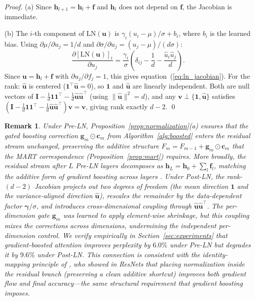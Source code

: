 \documentclass{article}
\newtheorem{remark}{Remark}
\theoremstyle{definition}
\begin{document}
\begin{proof}
(a) Since $\mathbf{h}_{l+1} = \mathbf{h}_l + \mathbf{f}$ and $\mathbf{h}_l$ does not depend on $\mathbf{f}$, the Jacobian is immediate.

(b) The $i$-th component of $\mathrm{LN}(\mathbf{u})$ is $\gamma_i(u_i - \mu)/\sigma + b_i$, where $b_i$ is the learned bias.
Using $\partial \mu / \partial u_j = 1/d$ and $\partial \sigma / \partial u_j = (u_j - \mu)/(d\sigma)$:
\[
\frac{\partial [\mathrm{LN}(\mathbf{u})]_i}{\partial u_j} = \frac{\gamma_i}{\sigma}\left(\delta_{ij} - \frac{1}{d} - \frac{\hat{u}_i \hat{u}_j}{d}\right).
\]
Since $\mathbf{u} = \mathbf{h}_l + \mathbf{f}$ with $\partial u_j / \partial f_j = 1$, this gives equation~(\ref{eq:ln_jacobian}).
For the rank: $\hat{\mathbf{u}}$ is centered ($\mathbf{1}^\top \hat{\mathbf{u}} = 0$), so $\mathbf{1}$ and $\hat{\mathbf{u}}$ are linearly independent.
Both are null vectors of $\mathbf{I} - \frac{1}{d}\mathbf{1}\mathbf{1}^\top - \frac{1}{d}\hat{\mathbf{u}}\hat{\mathbf{u}}^\top$ (using $\|\hat{\mathbf{u}}\|^2 = d$), and any $\mathbf{v} \perp \{\mathbf{1}, \hat{\mathbf{u}}\}$ satisfies $(\mathbf{I} - \frac{1}{d}\mathbf{1}\mathbf{1}^\top - \frac{1}{d}\hat{\mathbf{u}}\hat{\mathbf{u}}^\top)\mathbf{v} = \mathbf{v}$, giving rank exactly $d - 2$. \qed
\end{proof}

\begin{remark}
\label{rem:normalization}
Under Pre-LN, Proposition~\ref{prop:normalization}(a) ensures that the gated boosting correction $\mathbf{g}_m \odot \mathbf{c}_m$ from Algorithm~\ref{alg:boosted} enters the residual stream unchanged, preserving the additive structure $F_m = F_{m-1} + \mathbf{g}_m \odot \mathbf{c}_m$ that the MART correspondence (Proposition~\ref{prop:mart}) requires.
More broadly, the residual stream after $L$ Pre-LN layers decomposes as $\mathbf{h}_L = \mathbf{h}_0 + \sum_{l} \mathbf{f}_l$, matching the additive form of gradient boosting across layers \citep{cheng2024transformers}.
Under Post-LN, the rank-$(d{-}2)$ Jacobian projects out two degrees of freedom (the mean direction $\mathbf{1}$ and the variance-aligned direction $\hat{\mathbf{u}}$), rescales the remainder by the data-dependent factor $\boldsymbol{\gamma}/\sigma$, and introduces cross-dimensional coupling through $\hat{\mathbf{u}}\hat{\mathbf{u}}^\top$.
The per-dimension gate $\mathbf{g}_m$ was learned to apply element-wise shrinkage, but this coupling mixes the corrections across dimensions, undermining the independent per-dimension control.
We verify empirically in Section~\ref{sec:experiments} that gradient-boosted attention improves perplexity by $6.0\%$ under Pre-LN but \emph{degrades} it by $9.6\%$ under Post-LN.
This connection is consistent with the identity-mapping principle of \citet{he2016identity}, who showed in ResNets that placing normalization inside the residual branch (preserving a clean additive shortcut) improves both gradient flow and final accuracy---the same structural requirement that gradient boosting imposes.
\end{remark}
\end{document}
